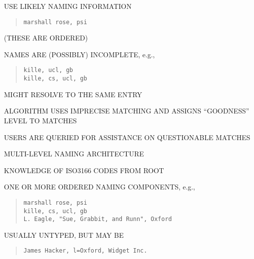 \begin{bwslide}

\begin{nrtc}
\item	USE LIKELY NAMING INFORMATION
\begin{quote}\small\begin{verbatim}
marshall rose, psi
\end{verbatim}\end{quote}
	(THESE ARE ORDERED)

\item	NAMES ARE (POSSIBLY) INCOMPLETE, e.g.,
\begin{quote}\small\begin{verbatim}
kille, ucl, gb
kille, cs, ucl, gb
\end{verbatim}\end{quote}
	MIGHT RESOLVE TO THE SAME ENTRY

\item	ALGORITHM USES IMPRECISE MATCHING AND ASSIGNS ``GOODNESS'' LEVEL TO
	MATCHES

\item	USERS ARE QUERIED FOR ASSISTANCE ON QUESTIONABLE MATCHES
\end{nrtc}
\end{bwslide}


\begin{bwslide}

\begin{nrtc}
\item	MULTI-LEVEL NAMING ARCHITECTURE

\item	KNOWLEDGE OF ISO3166 CODES FROM ROOT
\end{nrtc}
\end{bwslide}


\begin{bwslide}

\begin{nrtc}
\item	ONE OR MORE ORDERED NAMING COMPONENTS, e.g.,
\begin{quote}\small\begin{verbatim}
marshall rose, psi
kille, cs, ucl, gb
L. Eagle, "Sue, Grabbit, and Runn", Oxford
\end{verbatim}\end{quote}

\item	USUALLY UNTYPED, BUT MAY BE
\begin{quote}\small\begin{verbatim}
James Hacker, l=Oxford, Widget Inc.
\end{verbatim}\end{quote}
\end{nrtc}
\end{bwslide}


